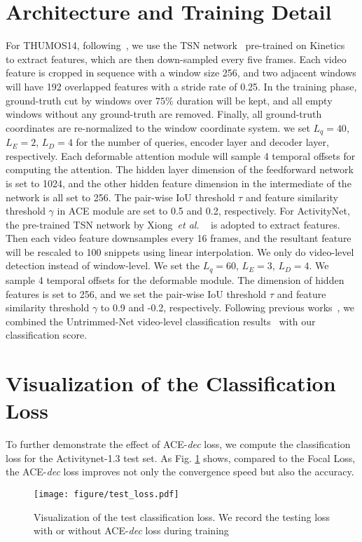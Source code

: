 \documentclass[runningheads]{llncs}
\def\etal{{\em et al. }}
\newcommand{\figref}[1]{Fig. \ref{#1}}
\def\cls{ACE }
\begin{document}
\section{Architecture and Training Detail}
For THUMOS14, following~\cite{xu2020g}, we use the TSN network~\cite{wang2018temporal} pre-trained on Kinetics~\cite{kay2017kinetics} to extract features, which are then down-sampled every five frames. 
Each video feature is cropped in sequence with a window size 256, and two adjacent windows will have 192 overlapped features with a stride rate of 0.25. In the training phase, ground-truth cut by windows over  $75\%$ duration will be kept, and all empty windows without any ground-truth are removed. Finally, all ground-truth coordinates are re-normalized to the window coordinate system. 
 we set $L_q=40$, $L_E=2$, $L_D=4$ for the number of queries, encoder layer and decoder layer, respectively. Each deformable attention module will sample 4 temporal offsets for computing the attention. The hidden layer dimension of the feedforward network is set to 1024, and the other hidden feature dimension in the intermediate of the network is all set to 256. The pair-wise IoU threshold $\tau$ and feature similarity threshold $\gamma$ in \cls module are set to 0.5 and 0.2, respectively. 
For ActivityNet, the pre-trained TSN network by Xiong~\etal~\cite{xiong2016cuhk} is adopted to extract features. Then each video feature downsamples every 16 frames, and the resultant feature will be rescaled to 100 snippets using linear interpolation. 
We only do video-level detection instead of window-level. 
We set the $L_q=60$, $L_E=3$, $L_D=4$. We sample 4 temporal offsets for the deformable module. 
The dimension of hidden features is set to 256, and we set the pair-wise IoU threshold $\tau$ and feature similarity threshold $\gamma$ to 0.9 and -0.2, respectively. Following previous works~\cite{xu2020g,zeng2019graph,zhao2020bottom,yang2020revisiting}, we combined the Untrimmed-Net video-level classification results~\cite{wang2017untrimmednets} with our classification score.


\section{Visualization of the Classification Loss}
To further demonstrate the effect of ACE-\textit{dec} loss, we compute the classification loss for the Activitynet-1.3 test set. As \figref{loss} shows, compared to the Focal Loss, the ACE-\textit{dec} loss improves not only the convergence speed but also the accuracy.

\begin{figure}[]
    \centering
\texttt{[image: figure/test\_loss.pdf]}
  \caption{Visualization of the test classification loss. We record the testing loss with or without ACE-\textit{dec} loss during training}
  \label{loss}
\end{figure}








\end{document}

